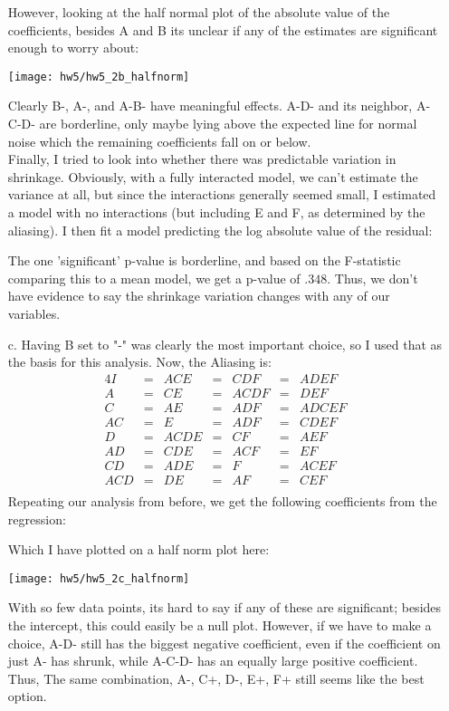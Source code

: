 \documentclass[11pt]{article}
\theoremstyle{definition}
\begin{document}
\begin{itemize}
        However, looking at the half normal plot of the absolute value of the coefficients, besides A and B its unclear if any of the estimates are significant enough to worry about:
        \begin{center}
            \texttt{[image: hw5/hw5\_2b\_halfnorm]}
        \end{center}
        Clearly B-, A-, and A-B- have meaningful effects. A-D- and its neighbor, A-C-D- are borderline, only maybe lying above the expected line for normal noise which the remaining coefficients fall on or below. \\
        Finally, I tried to look into whether there was predictable variation in shrinkage. Obviously, with a fully interacted model, we can't estimate the variance at all, but since the interactions generally seemed small, I estimated a model with no interactions (but including E and F, as determined by the aliasing). I then fit a model predicting the log absolute value of the residual:
        \FloatBarrier
         
        \FloatBarrier
        The one 'significant' p-value is borderline, and based on the F-statistic comparing this to a mean model, we get a p-value of $.348$. Thus, we don't have evidence to say the shrinkage variation changes with any of our variables.
    \item[c.]
        Having B set to "-" was clearly the most important choice, so I used that as the basis for this analysis. Now, the Aliasing is:
        \begin{alignat*}{4}
            I    &=& ACE   &=& CDF    &=& ADEF \\
            A    &=& CE    &=& ACDF   &=& DEF \\
            C    &=& AE    &=& ADF    &=& ADCEF \\
            AC   &=& E     &=& ADF    &=& CDEF \\
            D    &=& ACDE  &=& CF     &=& AEF \\
            AD   &=& CDE   &=& ACF    &=& EF \\
            CD   &=& ADE   &=& F      &=& ACEF \\
            ACD  &=& DE    &=& AF     &=& CEF \\
        \end{alignat*}
        Repeating our analysis from before, we get the following coefficients from the regression:
        \FloatBarrier
         
        \FloatBarrier
        Which I have plotted on a half norm plot here:
        \begin{center}
            \texttt{[image: hw5/hw5\_2c\_halfnorm]}
        \end{center}
        With so few data points, its hard to say if any of these are significant; besides the intercept, this could easily be a null plot. However, if we have to make a choice, A-D- still has the biggest negative coefficient, even if the coefficient on just A- has shrunk, while  A-C-D- has an equally large positive coefficient. Thus, The same combination, A-, C+, D-, E+, F+ still seems like the best option.







\end{itemize}
\end{document}

